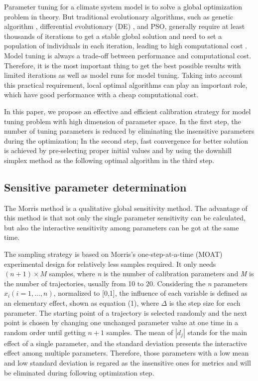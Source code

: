 \documentclass[gmd, manuscript]{copernicus}
\begin{document}
Parameter tuning for a climate system model is to solve a global optimization problem in theory.  But traditional evolutionary algorithms, such as genetic algorithm \citep{goldberg1989messy}, differential evolutionary (DE) \citep{storn1995differential}, and PSO, generally require at least  thousands of iterations to get a stable global solution and need to set a population of individuals in each iteration, leading to high computational cost \citep{hegerty2009comparative,shi1999empirical}. Model tuning is always a trade-off between performance and computational cost. Therefore, it is the most important thing to get the best possible results with limited iterations as well as model runs for model tuning. Taking into account  this practical requirement, local optimal algorithms can play an important role, which have good performance with a cheap computational cost. 


In this paper, we propose an effective and efficient calibration strategy for model tuning problem with high dimension of parameter space. In the first step, the number of tuning parameters is reduced by eliminating the insensitive parameters during the optimization; In the second step, fast convergence for better solution is achieved by pre-selecting proper initial values and by using the downhill simplex method as the following optimal algorithm in the third step. 


\subsection{Sensitive parameter determination}

The Morris method \citep{morris1991factorial, campolongo2007effective} is a qualitative global sensitivity method. The advantage of this method is that not only the single parameter sensitivity can be calculated, but also the interactive sensitivity among parameters can be got at the same time. 

The sampling strategy is based on Morris’s one-step-at-a-time (MOAT) experimental design for relatively less samples required. It only needs $(n+1) \times M$ samples, where \textit{n} is the number of calibration parameters and \textit{M} is the number of trajectories, usually from 10 to 20. Considering the \textit{n} parameters $x_i (i=1,...,n)$, normalized to [0,1], the influence of each variable is defined as an elementary effect, shown as equation (1), where $\Delta$ is the step size for each parameter. The starting point of a trajectory is selected randomly and the next point is chosen by changing one unchanged parameter value at one time in a random order until getting $n+1$ samples. The mean of $|d_j|$ stands for the main effect of a single parameter, and the standard deviation presents the interactive effect among multiple parameters. Therefore, those parameters with a low mean and low standard deviation is regared as the insensitive ones for metrics and will be eliminated during following optimization step. 
\end{document}
